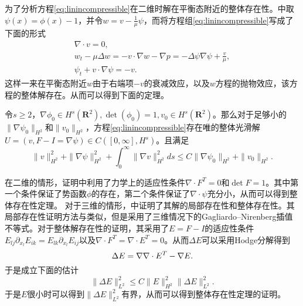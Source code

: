\documentclass{article}
\begin{document}
为了分析方程\eqref{eq:linincompressible}在二维时解在平衡态附近的整体存在性。\cite{lin2005hydrodynamics}中取$\psi(x) = \phi(x)-1$，并令$w=v-\frac{1}{\mu}\psi$，而将方程组\eqref{eq:linincompressible}写成了下面的形式
\begin{eqnarray*}
	\nabla \cdot v =0 , \\
	w_t - \mu \Delta w = - v \cdot \nabla w - \nabla p = - \Delta \psi \nabla \psi + \frac{v}{\mu}, \\
	\psi_t + v \cdot \nabla \psi = -v.
\end{eqnarray*}
这样一来在平衡态附近$w$由于右端项$-v$的衰减效应，以及$w$方程的抛物效应，该方程的整体解存在。从而可以得到下面的定理。
\begin{theorem}
	令$s \ge 2$，$\nabla \phi_0 \in H^s(\mathbf{R}^2),\det(\phi_0) = 1, v_0 \in H^s(\mathbf{R}^2)$。那么对于足够小的$\|\nabla \psi_0\|_{H^2}$和$\|v_0\|_{H^2}$，方程\eqref{eq:linincompressible}存在唯的整体光滑解$U=(v,F-I=\nabla \psi) \in C([0,\infty],H^s)$。且满足
	\begin{equation*}
		\|v\|_{H^2}^2 +\|\nabla \psi\|_{H^2}^2 + \int_0^\infty \|\nabla v\|_{H^2}
^2ds \le C \|\nabla \psi_0\|_{H^2} + \|v_0\|_{H^2}.
	\end{equation*}
	\end{theorem}
	在二维的情形，证明中利用了力学上的适应性条件$\nabla \cdot F^T = 0$和$\det F =1$。其中第一个条件保证了势函数$\phi$的存在，第二个条件保证了$\nabla \cdot \psi$充分小，从而可以得到整体存在性定理。
对于三维的情形，\cite{lei2008global}中证明了其解的局部存在性和整体存在性。其局部存在性证明方法与\cite{lin2005hydrodynamics}类似，但是采用了三维情况下的Gagliardo–Nirenberg插值不等式。对于整体解存在性的证明，其采用了$E=F-I$的适应性条件$E_{lj}\partial_{x_l} E_{ik}=E_{lk}\partial_{x_l} E_{ij}$以及$\nabla \cdot F^T=\nabla \cdot E^T=0$。从而$\Delta E$可以采用Hodge分解得到
\begin{equation*}
	\Delta E = \nabla \nabla \cdot E^T -  \nabla \time \nabla E.
\end{equation*}
于是成立下面的估计
\begin{equation*}
	\|\Delta E\|^2_{L^2} \le C \|E\|_{H^2}^2 \|\Delta E\|_{L^2}^2.
\end{equation*}
于是$E$很小时可以得到$\|\Delta E\|^2_{L^2}$有界，从而可以得到整体存在性定理的证明\cite{lin2005hydrodynamics}。
\end{document}
